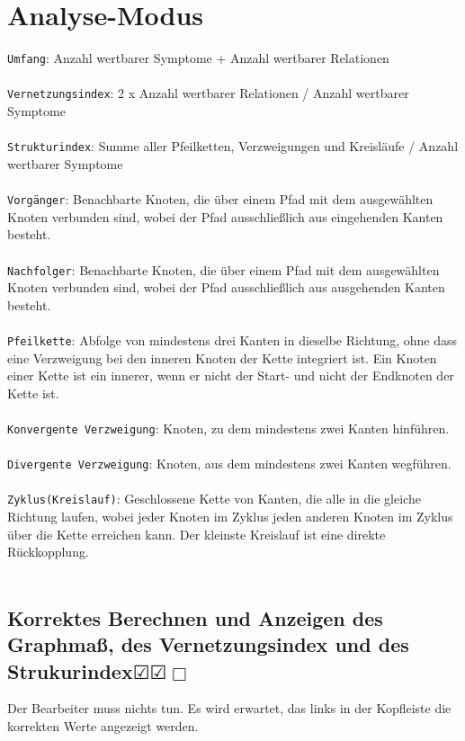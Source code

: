 \documentclass[enabledeprecatedfontcommands]{scrartcl}
\newcommand{\subsectiont}[2]{\subsection[#1]{#1{\normalsize\normalfont #2}}}
\newcommand{\leer}{$\Box$}
\newcommand{\ok}{$\CheckedBox$}
\begin{document}
\section{Analyse-Modus}

\texttt{Umfang}: Anzahl wertbarer Symptome + Anzahl wertbarer Relationen\\\\
\texttt{Vernetzungsindex}: 2 x Anzahl wertbarer Relationen / Anzahl wertbarer Symptome\\\\
\texttt{Strukturindex}: Summe aller Pfeilketten, Verzweigungen und Kreisläufe / Anzahl wertbarer Symptome\\\\
\texttt{Vorgänger}: Benachbarte Knoten, die über einem Pfad mit dem ausgewählten Knoten verbunden sind, 
wobei der Pfad ausschließlich aus eingehenden Kanten besteht.\\\\
\texttt{Nachfolger}: Benachbarte Knoten, die über einem Pfad mit dem ausgewählten Knoten verbunden sind,
wobei der Pfad ausschließlich aus ausgehenden Kanten besteht.\\\\
\texttt{Pfeilkette}: Abfolge von mindestens drei Kanten in dieselbe Richtung, ohne dass eine Verzweigung bei den inneren Knoten der Kette integriert ist. Ein Knoten einer Kette ist ein innerer, wenn er nicht der Start- und nicht der Endknoten der Kette ist.\\\\
\texttt{Konvergente Verzweigung}: Knoten, zu dem mindestens zwei Kanten hinführen.\\\\
\texttt{Divergente Verzweigung}: Knoten, aus dem mindestens zwei Kanten wegführen.\\\\
\texttt{Zyklus(Kreislauf)}: Geschlossene Kette von Kanten, die alle in die gleiche Richtung laufen, wobei jeder Knoten im Zyklus jeden anderen Knoten im Zyklus über die Kette erreichen kann. Der kleinste Kreislauf ist eine direkte Rückkopplung.\\\\

\subsectiont{Korrektes Berechnen und Anzeigen des Graphmaß, des Vernetzungsindex und des Strukurindex}{\dotfill\ok\ok\leer}
Der Bearbeiter muss nichts tun. Es wird erwartet, das links in der Kopfleiste die korrekten Werte angezeigt werden. 
\end{document}
